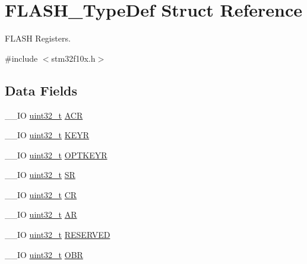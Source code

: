 \hypertarget{struct_f_l_a_s_h___type_def}{\section{F\-L\-A\-S\-H\-\_\-\-Type\-Def Struct Reference}
\label{struct_f_l_a_s_h___type_def}
}


F\-L\-A\-S\-H Registers.  




{\ttfamily \#include $<$stm32f10x.\-h$>$}

\subsection*{Data Fields}
\begin{DoxyCompactItemize}
\item 
\-\_\-\-\_\-\-I\-O \hyperlink{stdint_8h_a435d1572bf3f880d55459d9805097f62}{uint32\-\_\-t} \hyperlink{struct_f_l_a_s_h___type_def_aaf432a8a8948613f4f66fcace5d2e5fe}{A\-C\-R}
\item 
\-\_\-\-\_\-\-I\-O \hyperlink{stdint_8h_a435d1572bf3f880d55459d9805097f62}{uint32\-\_\-t} \hyperlink{struct_f_l_a_s_h___type_def_a802e9a26a89b44decd2d32d97f729dd3}{K\-E\-Y\-R}
\item 
\-\_\-\-\_\-\-I\-O \hyperlink{stdint_8h_a435d1572bf3f880d55459d9805097f62}{uint32\-\_\-t} \hyperlink{struct_f_l_a_s_h___type_def_a793cd13a4636c9785fdb99316f7fd7ab}{O\-P\-T\-K\-E\-Y\-R}
\item 
\-\_\-\-\_\-\-I\-O \hyperlink{stdint_8h_a435d1572bf3f880d55459d9805097f62}{uint32\-\_\-t} \hyperlink{struct_f_l_a_s_h___type_def_a52c4943c64904227a559bf6f14ce4de6}{S\-R}
\item 
\-\_\-\-\_\-\-I\-O \hyperlink{stdint_8h_a435d1572bf3f880d55459d9805097f62}{uint32\-\_\-t} \hyperlink{struct_f_l_a_s_h___type_def_a7919306d0e032a855200420a57f884d7}{C\-R}
\item 
\-\_\-\-\_\-\-I\-O \hyperlink{stdint_8h_a435d1572bf3f880d55459d9805097f62}{uint32\-\_\-t} \hyperlink{struct_f_l_a_s_h___type_def_a9cd77bc29038841798b4b63c5cecdb9d}{A\-R}
\item 
\-\_\-\-\_\-\-I\-O \hyperlink{stdint_8h_a435d1572bf3f880d55459d9805097f62}{uint32\-\_\-t} \hyperlink{struct_f_l_a_s_h___type_def_a32e5cc660e711dc5424f827e2d4efd88}{R\-E\-S\-E\-R\-V\-E\-D}
\item 
\-\_\-\-\_\-\-I\-O \hyperlink{stdint_8h_a435d1572bf3f880d55459d9805097f62}{uint32\-\_\-t} \hyperlink{struct_f_l_a_s_h___type_def_a24dece1e3b3185456afe34c3dc6add2e}{O\-B\-R}

\end{DoxyCompactItemize}
